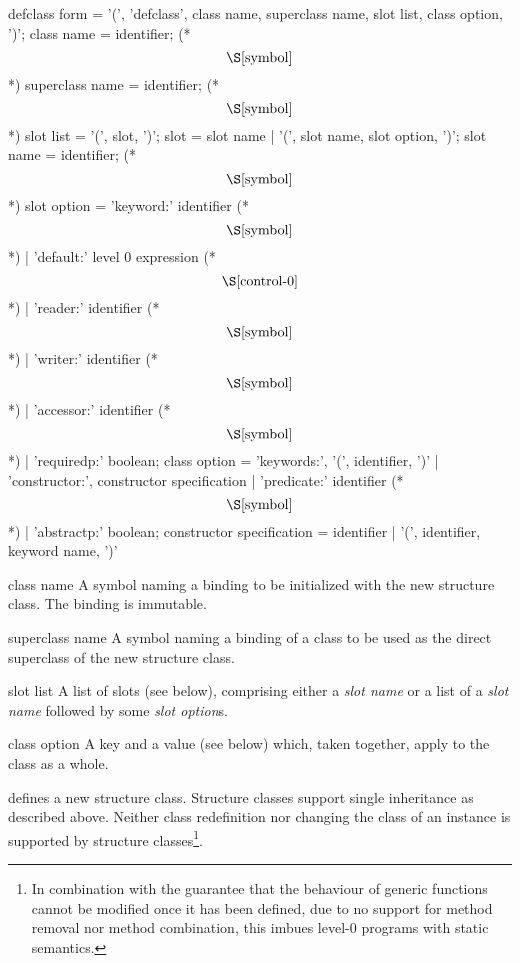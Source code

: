 \begin{optDefinition}
\label{defclass}
\Syntax
\savesyntax{}\vbox{\syntax
defclass form
   = '(', 'defclass', class name, superclass name,
     slot list, {class option}, ')';
class name
   = identifier; (* \[\S\ref{symbol}\] *)
superclass name
   = identifier; (* \[\S\ref{symbol}\] *)
slot list
   = '(', {slot}, ')';
slot
   = slot name
   | '(', slot name, {slot option}, ')';
slot name
   = identifier; (* \[\S\ref{symbol}\] *)
slot option
   = 'keyword:' identifier (* \[\S\ref{symbol}\] *)
   | 'default:' level 0 expression (* \[\S\ref{control-0}\] *)
   | 'reader:' identifier (* \[\S\ref{symbol}\] *)
   | 'writer:' identifier (* \[\S\ref{symbol}\] *)
   | 'accessor:' identifier (* \[\S\ref{symbol}\] *)
   | 'requiredp:' boolean;
class option
   = 'keywords:', '(', {identifier}, ')'
   | 'constructor:', constructor specification
   | 'predicate:' identifier (* \[\S\ref{symbol}\] *)
   | 'abstractp:' boolean;
constructor specification
   = identifier
   | '(', identifier, {keyword name}, ')'
\endsyntax}
\label{defclass-syntax-table}

\begin{arguments}
    \item[class name] A symbol naming a binding to be initialized with the new
    structure class. The binding is immutable.

    \item[superclass name] A symbol naming a binding of a class to be used as
    the direct superclass of the new structure class.

    \item[slot list] A list of slots (see below), comprising either a {\em slot
        name} or a list of a {\em slot name} followed by some {\em slot
        option}s.

    \item[class option] A key and a value (see below) which, taken together,
    apply to the class as a whole.
\end{arguments}
%
\remarks%
 defines a new structure class. Structure classes support
single inheritance as described above. Neither class redefinition nor changing
the class of an instance is supported by structure classes\footnote{In
    combination with the guarantee that the behaviour of generic functions
    cannot be modified once it has been defined, due to no support for method
    removal nor method combination, this imbues level-0 programs with static
    semantics.}.


\end{optDefinition}
